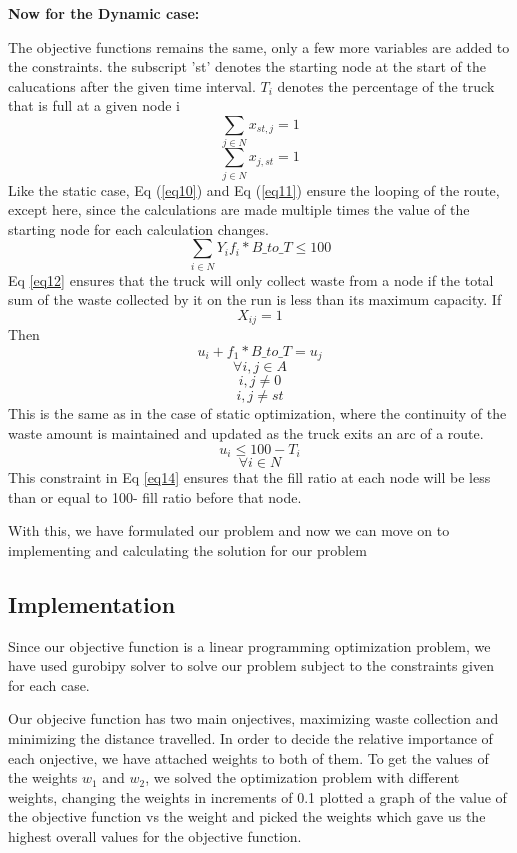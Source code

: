\documentclass[12pt]{article}
\begin{document}
\textbf{Now for the Dynamic case:}

The objective functions remains the same, only a few more variables are added to the constraints. the subscript 'st' denotes the starting node at the start of the calucations after the given time interval. $T_i$ denotes the percentage of the truck that is full at a given node i
\begin{equation}\label{eq10}
    \sum_{j\in N}x_{st,j}=1
\end{equation}
\begin{equation}\label{eq11}
    \sum_{j\in N}x_{j,st}=1
\end{equation}
Like the static case, Eq (\ref{eq10}) and Eq (\ref{eq11}) ensure the looping of the route, except here, since the calculations are made multiple times the value of the starting node for each calculation changes.
\begin{equation}\label{eq12}
    \sum_{i\in N}Y_i f_i* B\_to\_T\le100
\end{equation}
Eq \eqref{eq12} ensures that the truck will only collect waste from a node if the total sum of the waste collected by it on the run is less than its maximum capacity.
If
$$X_{ij}=1$$
Then
\begin{equation}\label{eq13}
    u_i+f_1*B\_to\_T=u_j
\end{equation}
$$\forall i,j\in A$$
$$i,j\ne 0 $$
$$ i,j \ne st $$
This is the same as in the case of static optimization, where the continuity of the waste amount is maintained and updated as the truck exits an arc of a route.
\begin{equation}\label{eq14}
    u_i\le 100 - T_i
\end{equation}
$$\forall i \in N $$
This constraint in Eq \eqref{eq14} ensures that the fill ratio at each node will be less than or equal to 100- fill ratio before that node.

With this, we have formulated our problem and now we can move on to implementing and calculating the solution for our problem

\subsection{Implementation}

Since our objective function is a linear programming optimization problem, we have used gurobipy solver to solve our problem subject to the constraints given for each case.

Our objecive function has two main onjectives, maximizing waste collection and minimizing the distance travelled. In order to decide the relative importance of each onjective, we have attached weights to both of them. To get the values of the weights $w_1$ and $w_2$, we solved the optimization problem with different weights, changing the weights in increments of 0.1 plotted a graph of the value of the objective function vs the weight and picked the weights which gave us the highest overall values for the objective function.       
\end{document}
